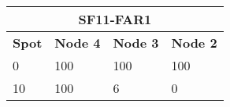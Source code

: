 \begin{tabular}{|l|l|l|l|}
\multicolumn{4}{c}{\textbf{SF11-FAR1}} \\ \hline 
\textbf{Spot} & \textbf{Node 4} & \textbf{Node 3} & \textbf{Node 2} \\ \hline
0 & 100 & 100 & 100 \\ \hline
10 & 100 & 6 & 0 \\ \hline
\end{tabular}
